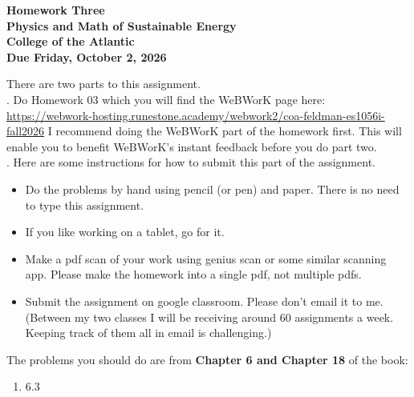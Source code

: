 \documentclass[12pt]{article}
\begin{document}
\pagestyle{empty}
 
\begin{center}
{\LARGE {\bf Homework Three}}\\
\bigskip
{\Large {\bf Physics and Math of Sustainable Energy}}\\
\bigskip
{\Large {\bf College of the Atlantic}}\\
\bigskip
{ {\bf Due Friday, October 2, 2026}}\\ 
\end{center}
\medskip


\noindent There are two parts to this assignment.\\

.  Do Homework 03 which you
will find the WeBWorK page here: \url{https://webwork-hosting.runestone.academy/webwork2/coa-feldman-es1056i-fall2026}
I recommend doing the WeBWorK part of the homework first.  This will
enable you to benefit WeBWorK's instant feedback before you do part
two.\\ 


.  Here are some
instructions for how to submit this part of the assignment.
\begin{itemize}
\item Do the problems by hand using pencil (or pen) and paper.
  There is no need to type this assignment.
\item If you like working on a tablet, go for it. 
\item Make a pdf scan of your work using genius scan or some
  similar scanning app.  Please make the homework into a single
  pdf, not multiple pdfs.
\item Submit the assignment on google classroom.  Please don't
  email it to me.  (Between my two classes I will be receiving
  around 60 assignments a week.  Keeping track of them all in email 
  is challenging.)\\
\end{itemize}

\noindent The problems you should do are from {\bf Chapter 6 and Chapter 18} of the book: \\



\begin{enumerate}
  \setlength{\itemsep}{-1mm}
\item 6.3\\
\end{enumerate}
\end{document}

